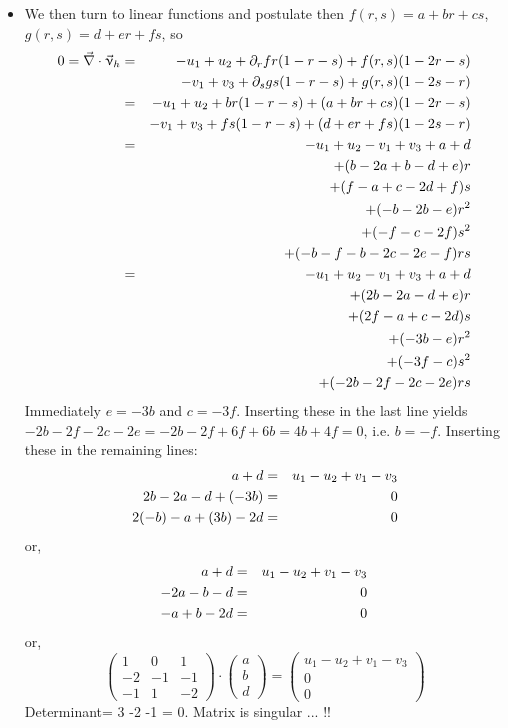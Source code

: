\begin{itemize}
\item
We then turn to linear functions and postulate then $f(r,s)=a+br+cs$, $g(r,s)=d+er+fs$, so  
\begin{eqnarray}
0=\vec\nabla\cdot\vec\upnu_h 
&=& -u_1+u_2 + \partial_r f r(1-r-s) + f(r,s)(1-2r-s) \nonumber\\
&&  -v_1+v_3 + \partial_s g s(1-r-s) + g(r,s)(1-2s-r) \nonumber\\
&=& -u_1+u_2 + b r(1-r-s) + (a+br+cs) (1-2r-s) \nonumber\\
&&  -v_1+v_3 + f s(1-r-s) + (d+er+fs)(1-2s-r) \nonumber\\
&=& -u_1+u_2  -v_1+v_3 + a + d \nonumber\\
&& +(b-2a+b-d+e)r \nonumber\\
&& +(f-a+c-2d+f)s \nonumber\\
&& +(-b-2b-e)r^2 \nonumber\\
&& +(-f-c-2f)s^2 \nonumber\\
&& +(-b-f-b-2c-2e-f)rs \nonumber\\
&=& -u_1+u_2  -v_1+v_3 + a + d \nonumber\\
&& +(2b-2a-d+e)r \nonumber\\
&& +(2f-a+c-2d)s \nonumber\\
&& +(-3b-e)r^2 \nonumber\\
&& +(-3f-c)s^2 \nonumber\\
&& +(-2b-2f-2c-2e)rs  \nonumber
\end{eqnarray}
Immediately $e=-3b$ and $c=-3f$. Inserting these in the last line yields
$-2b-2f-2c-2e=-2b-2f+6f+6b=4b+4f=0$, i.e. $b=-f$.
Inserting these in the remaining lines:
\begin{eqnarray}
a+d &=& u_1-u_2  +v_1-v_3 \nonumber\\
2b-2a-d+(-3b) &=& 0 \nonumber\\
2(-b)-a+(3b)-2d &=& 0 \nonumber
\end{eqnarray}
or,
\begin{eqnarray}
a+d &=& u_1-u_2  +v_1-v_3 \nonumber\\
-2a-b-d &=& 0 \nonumber\\
-a + b-2d &=& 0 \nonumber
\end{eqnarray}
or, 
\[
\left(
\begin{array}{ccc}
1 &0 & 1 \\
-2 & -1 & -1 \\
-1 & 1 & -2 
\end{array}
\right)
\cdot
\left(
\begin{array}{c}
a \\ b  \\d 
\end{array}
\right)
=
\left(
\begin{array}{c}
u_1-u_2+v_1-v_3 \\
0 \\ 0 
\end{array}
\right)
\]
Determinant= 3 -2 -1 = 0. Matrix is singular ... !! 


\end{itemize}
